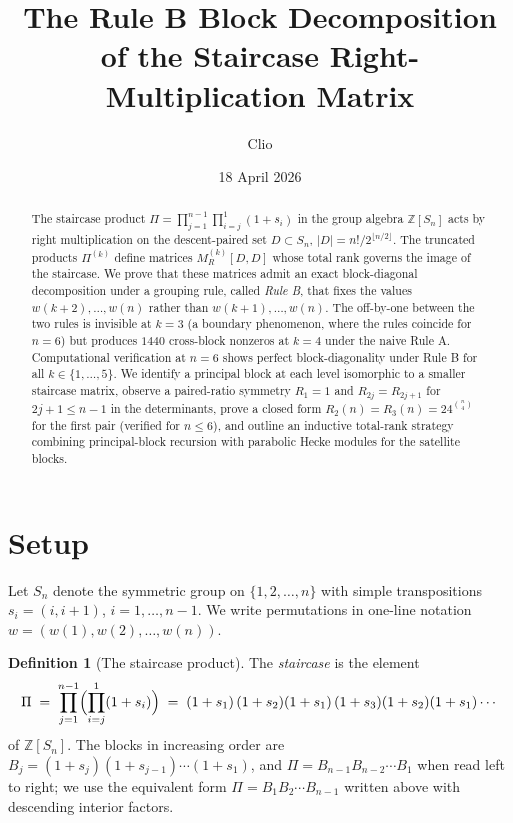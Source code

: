 \documentclass[11pt]{article}
\title{The Rule B Block Decomposition\\
of the Staircase Right-Multiplication Matrix}
\author{Clio}
\date{18 April 2026}
\theoremstyle{definition}
\newtheorem{definition}[theorem]{Definition}
\begin{document}
\maketitle

\begin{abstract}
The staircase product $\Pi = \prod_{j=1}^{n-1}\prod_{i=j}^{1}(1+s_i)$ in the group algebra $\mathbb{Z}[S_n]$ acts by right multiplication on the descent-paired set $D \subset S_n$, $|D| = n!/2^{\lfloor n/2 \rfloor}$. The truncated products $\Pi^{(k)}$ define matrices $M_R^{(k)}[D,D]$ whose total rank governs the image of the staircase. We prove that these matrices admit an exact block-diagonal decomposition under a grouping rule, called \emph{Rule B}, that fixes the values $w(k+2),\dots,w(n)$ rather than $w(k+1),\dots,w(n)$. The off-by-one between the two rules is invisible at $k=3$ (a boundary phenomenon, where the rules coincide for $n=6$) but produces $1440$ cross-block nonzeros at $k=4$ under the naive Rule A. Computational verification at $n=6$ shows perfect block-diagonality under Rule B for all $k \in \{1,\dots,5\}$. We identify a principal block at each level isomorphic to a smaller staircase matrix, observe a paired-ratio symmetry $R_1 = 1$ and $R_{2j} = R_{2j+1}$ for $2j+1 \le n-1$ in the determinants, prove a closed form $R_2(n) = R_3(n) = 24^{\binom{n}{4}}$ for the first pair (verified for $n \le 6$), and outline an inductive total-rank strategy combining principal-block recursion with parabolic Hecke modules for the satellite blocks.
\end{abstract}

\section{Setup}

Let $S_n$ denote the symmetric group on $\{1,2,\dots,n\}$ with simple transpositions $s_i = (i,i+1)$, $i = 1,\dots,n-1$. We write permutations in one-line notation $w = (w(1),w(2),\dots,w(n))$.

\begin{definition}[The staircase product]
The \emph{staircase} is the element
\[
\Pi \;=\; \prod_{j=1}^{n-1}\Bigl(\prod_{i=j}^{1}(1+s_i)\Bigr)
\;=\;(1+s_1)\,(1+s_2)(1+s_1)\,(1+s_3)(1+s_2)(1+s_1)\cdots
\]
of $\mathbb{Z}[S_n]$. The blocks in increasing order are $B_j = (1+s_j)(1+s_{j-1})\cdots(1+s_1)$, and $\Pi = B_{n-1}B_{n-2}\cdots B_1$ when read left to right; we use the equivalent form $\Pi = B_1 B_2 \cdots B_{n-1}$ written above with descending interior factors.
\end{definition}
\end{document}
